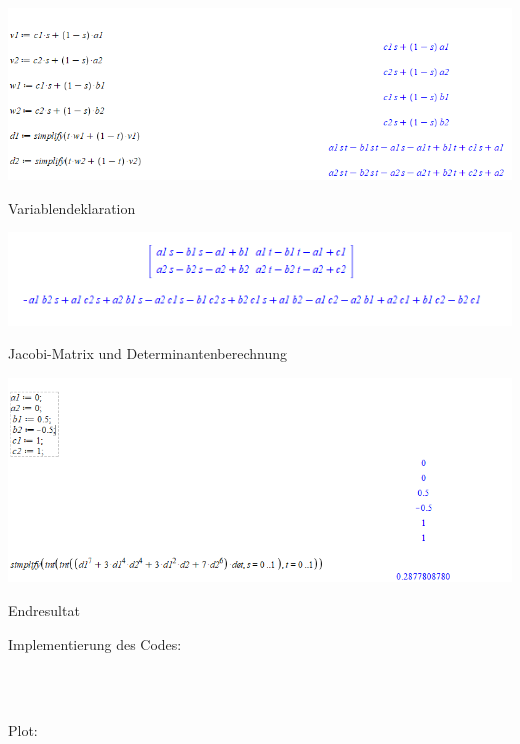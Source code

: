 \documentclass[a4paper,11pt,bibliography=totoc,listof=totoc,headinclude=true,cleardoublepage=empty,oneside]{scrbook}
\begin{document}
		
			
				\centering
				\includegraphics[width=1\textwidth]{tria_mw1.png}
				\centerline{Variablendeklaration}
				\label{fig:Bild1}
			
			
		
		
		
			
				
			\centering
			\includegraphics[width=1\textwidth]{mw12.png}
			\centerline{Jacobi-Matrix und Determinantenberechnung}
			\label{fig:Bild1}
			
			
		
			
			
				\centering
				\includegraphics[width=1\textwidth]{tria_mw4.png}
				\centerline{Endresultat}
				\label{fig:Bild1}
						
			
			
	\vspace{4cm}
			
			
			
			\color{change2}
			Implementierung des Codes: \\ 
			
			\color{change}				 
			\begin{lstlisting} 
			
			
			\end{lstlisting} 
			\color{change2}Plot:
				
\end{document}
